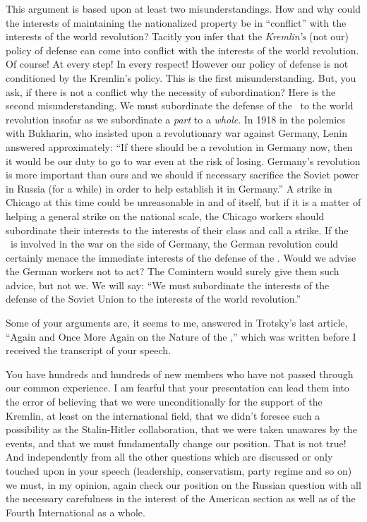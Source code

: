 This argument is based upon at least two misunderstandings. How and why could the interests of maintaining the nationalized property be in “conflict” with the interests of the world revolution? Tacitly you infer that the \emph{Kremlin’s} (not our) policy of defense can come into conflict with the interests of the world revolution. Of course! At every step! In every respect! However our policy of defense is not conditioned by the Kremlin’s policy. This is the first misunderstanding. But, you ask, if there is not a conflict why the necessity of subordination? Here is the second misunderstanding. We must subordinate the defense of the \USSR\ to the world revolution insofar as we subordinate a \emph{part} to a \emph{whole}. In 1918 in the polemics with Bukharin, who insisted upon a revolutionary war against Germany, Lenin answered approximately: “If there should be a revolution in Germany now, then it would be our duty to go to war even at the risk of losing. Germany’s revolution is more important than ours and we should if necessary sacrifice the Soviet power in Russia (for a while) in order to help establish it in Germany.” A strike in Chicago at this time could be unreasonable in and of itself, but if it is a matter of helping a general strike on the national scale, the Chicago workers should subordinate their interests to the interests of their class and call a strike. If the \USSR\ is involved in the war on the side of Germany, the German revolution could certainly menace the immediate interests of the defense of the \USSR. Would we advise the German workers not to act? The Comintern would surely give them such advice, but not we. We will say: “We must subordinate the interests of the defense of the Soviet Union to the interests of the world revolution.”
\nowidow

Some of your arguments are, it seems to me, answered in Trotsky’s last article, ``Again and Once More Again on the Nature of the \USSR,'' which was written before I received the transcript of your speech.

You have hundreds and hundreds of new members who have not passed through our common experience. I am fearful that your presentation can lead them into the error of believing that we were unconditionally for the support of the Kremlin, at least on the international field, that we didn’t foresee such a possibility as the Stalin-Hitler collaboration, that we were taken unawares by the events, and that we must fundamentally change our position. That is not true! And independently from all the other questions which are discussed or only touched upon in your speech (leadership, conservatism, party regime and so on) we must, in my opinion, again check our position on the Russian question with all the necessary carefulness in the interest of the American section as well as of the Fourth International as a whole.

